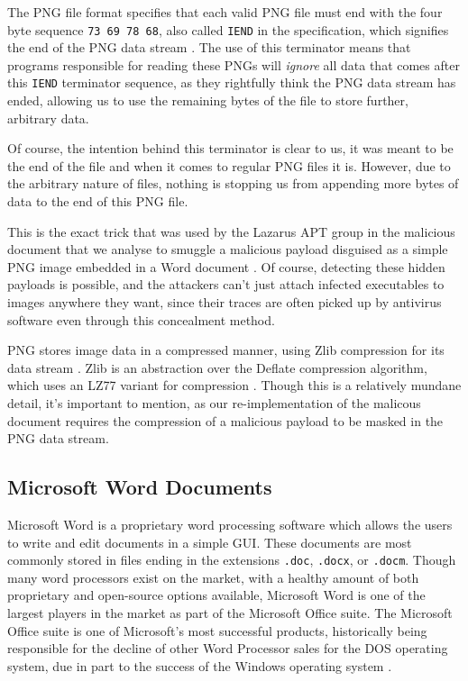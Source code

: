 The \acrshort{PNG} file format specifies that each valid \acrshort{PNG} file must end with the four byte sequence 
\verb+73 69 78 68+, also called \verb+IEND+ in the specification, which signifies the end of the PNG data stream 
\cite{png-standard}. The use of this terminator means that programs responsible for reading these \acrshort{PNG}s 
will \emph{ignore} all data that comes after this \verb+IEND+ terminator sequence, as they rightfully think the
\acrshort{PNG} data stream has ended, allowing us to use the remaining bytes of the file to store further,
arbitrary data. 

Of course, the intention behind this terminator is clear to us, it was meant to be the end of the file and when it comes
to regular \acrshort{PNG} files it is. However, due to the arbitrary nature of files, nothing is stopping us from 
appending more bytes of data to the end of this \acrshort{PNG} file.

This is the exact trick that was used by the Lazarus \acrshort{APT} group in the malicious document that we analyse to
smuggle a malicious payload disguised as a simple \acrshort{PNG} image embedded in a Word document \cite{jazi-article}.
Of course, detecting these hidden payloads is possible, and the attackers can't just attach infected executables to
images anywhere they want, since their traces are often picked up by antivirus software even through this concealment
method.

\acrshort{PNG} stores image data in a compressed manner, using Zlib compression for its data stream \cite{png-standard}. 
Zlib is an abstraction over the Deflate compression algorithm, which uses an LZ77 variant for compression \cite{zlib-tech}. 
Though this is a relatively mundane detail, it's important to mention, as our re-implementation of the malicous document
requires the compression of a malicious payload to be masked in the \acrshort{PNG} data stream.

\subsection{Microsoft Word Documents}
Microsoft Word is a proprietary word processing software which allows the users to write and edit documents in a simple
\acrfull{GUI}. These documents are most commonly stored in files ending in the extensions \verb+.doc+, 
\verb+.docx+, or \verb+.docm+. Though many word processors exist on the market, with a healthy amount of both
proprietary and open-source options available, Microsoft Word is one of the largest players in the market as part of the
Microsoft Office suite. The Microsoft Office suite is one of Microsoft's most successful products, historically being
responsible for the decline of other Word Processor sales for the DOS operating system, due in part to the success of
the Windows operating system \cite{bergin-word-processors}.

